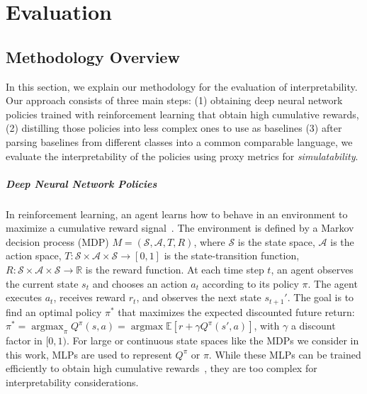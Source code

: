\chapter{Evaluation}
\section{Methodology Overview}\label{sec:methodology}
In this section, we explain our methodology for the evaluation of interpretability.
Our approach consists of three main steps: (1) obtaining deep neural network policies trained with reinforcement learning that obtain high cumulative rewards, (2) distilling those policies into less complex ones to use as baselines (3) after parsing baselines from different classes into a common comparable language, we evaluate the interpretability of the policies using proxy metrics for \textit{simulatability}.

\paragraph{Deep Neural Network Policies}
In reinforcement learning, an agent learns how to behave in an environment to maximize a cumulative reward signal~\cite{sutton}. 
The environment is defined by a Markov decision process (MDP) $M = ( \mathcal{S}, \mathcal{A}, T, R)$, where $\mathcal{S}$ is the state space, $\mathcal{A}$ is the action space, $T : \mathcal{S} \times \mathcal{A} \times \mathcal{S} \rightarrow [0, 1]$ is the state-transition function, $R : \mathcal{S} \times \mathcal{A} \times \mathcal{S} \rightarrow \mathbb{R}$ is the reward function.
At each time step $t$, an agent observes the current state $s_t$ and chooses an action $a_t$ according to its policy $\pi$.
The agent executes $a_t$, receives reward $r_t$, and observes the next state $s_{t+1}'$.
The goal is to find an optimal policy $\pi^*$ that maximizes the expected discounted future return: $\pi^* = \operatorname{argmax}_{\pi} Q^\pi (s, a) =\operatorname{argmax} \mathbb{E}[r+\gamma Q^\pi(s', a)]$, with $\gamma$ a discount factor in $[0,1)$. For large or continuous state spaces like the MDPs we consider in this work, MLPs are used to represent $Q^\pi$ or $\pi$.
While these MLPs can be trained efficiently to obtain high cumulative rewards~\cite{ppo,dqn}, they are too complex for interpretability considerations.


